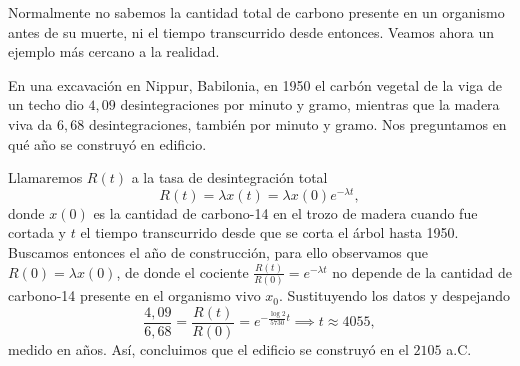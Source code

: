 \documentclass[../ecuaciones_diferenciales.tex]{subfiles}
\begin{document}
Normalmente no sabemos la cantidad total de carbono presente en un organismo
antes de su muerte, ni el tiempo transcurrido desde entonces. Veamos ahora un
ejemplo más cercano a la realidad.

\begin{example}
	En una excavación en Nippur, Babilonia, en 1950 el carbón vegetal de la viga
	de un techo dio \(4,09\) desintegraciones por minuto y gramo, mientras que
	la madera viva da \(6,68\) desintegraciones, también por minuto y gramo.
	Nos preguntamos en qué año se construyó en edificio.
\end{example}

\begin{solution}
	Llamaremos \(R(t)\) a la tasa de desintegración total
	\[R(t) = \lambda x(t) = \lambda x(0) e^{-\lambda t},\]
	donde \(x(0)\) es la
	cantidad de carbono-14 en el trozo de madera cuando fue cortada y \(t\) el
	tiempo transcurrido desde que se corta el árbol hasta 1950. Buscamos entonces
	el año de construcción, para ello observamos que \(R(0) = \lambda x(0)\), de
	donde el cociente \(\frac{R(t)}{R(0)} = e^{-\lambda t}\) no depende de la
	cantidad de carbono-14 presente en el organismo vivo \(x_0\). Sustituyendo
	los datos y despejando
	\[\frac{4,09}{6,68} = \frac{R(t)}{R(0)} = e^{-\frac{\log 2}{5730} t}
		\implies t \approx 4055,\]
	medido en años. Así, concluimos que el edificio se construyó en el \(2105\)
	a.C.
\end{solution}
\end{document}
